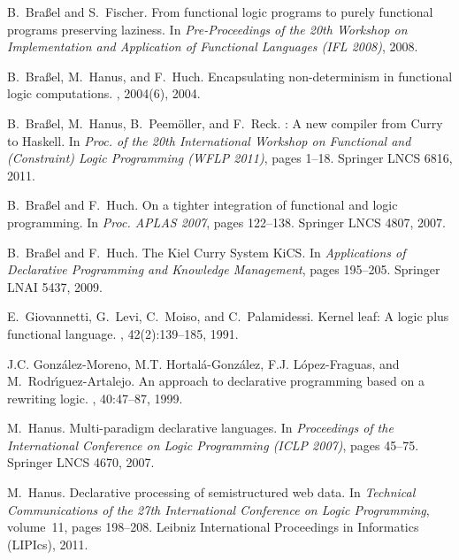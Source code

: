 \documentclass{llncs}
\begin{document}
\begin{thebibliography}{10}
B.~Bra{\ss}el and S.~Fischer.
\newblock From functional logic programs to purely functional programs
  preserving laziness.
\newblock In {\em Pre-Proceedings of the 20th Workshop on Implementation and
  Application of Functional Languages (IFL 2008)}, 2008.

B.~Bra{\ss}el, M.~Hanus, and F.~Huch.
\newblock Encapsulating non-determinism in functional logic computations.
, 2004(6), 2004.

B.~Bra{\ss}el, M.~Hanus, B.~Peem{\"o}ller, and F.~Reck.
: A new compiler from {Curry} to {Haskell}.
\newblock In {\em Proc. of the 20th International Workshop on Functional and
  (Constraint) Logic Programming (WFLP 2011)}, pages 1--18. Springer LNCS 6816,
  2011.

B.~Bra{\ss}el and F.~Huch.
\newblock On a tighter integration of functional and logic programming.
\newblock In {\em Proc. APLAS 2007}, pages 122--138. Springer LNCS 4807, 2007.

B.~Bra{\ss}el and F.~Huch.
\newblock The {Kiel} {Curry} {System} {KiCS}.
\newblock In {\em Applications of Declarative Programming and Knowledge
  Management}, pages 195--205. Springer LNAI 5437, 2009.

E.~Giovannetti, G.~Levi, C.~Moiso, and C.~Palamidessi.
\newblock Kernel leaf: A logic plus functional language.
, 42(2):139--185, 1991.

J.C. Gonz{\'a}lez-Moreno, M.T. Hortal{\'a}-Gonz{\'a}lez, F.J.
  L{\'o}pez-Fraguas, and M.~Rodr{\'\i}guez-Artalejo.
\newblock An approach to declarative programming based on a rewriting logic.
, 40:47--87, 1999.

M.~Hanus.
\newblock Multi-paradigm declarative languages.
\newblock In {\em Proceedings of the International Conference on Logic
  Programming (ICLP 2007)}, pages 45--75. Springer LNCS 4670, 2007.

M.~Hanus.
\newblock Declarative processing of semistructured web data.
\newblock In {\em Technical Communications of the 27th International Conference
  on Logic Programming}, volume~11, pages 198--208. Leibniz International
  Proceedings in Informatics (LIPIcs), 2011.


\end{thebibliography}
\end{document}
